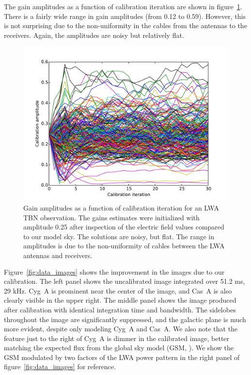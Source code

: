 \documentclass[a4paper,fleqn,usenatbib]{mnras}
\begin{document}
The gain amplitudes as a function of calibration iteration are shown in 
figure~\ref{fig:data_amp}. There is a fairly wide range in gain amplitudes (from 0.12 to 0.59). 
However, this is not surprising due to the non-uniformity in the cables from the antennas to the 
receivers. Again, the amplitudes are noisy but relatively flat.

\begin{figure}
\begin{center}
\includegraphics[width=\columnwidth]{fig7.pdf}
\caption{Gain amplitudes as a function of calibration iteration for an LWA TBN observation. The 
gains estimates were initialized with amplitude 0.25 after inspection of the electric field values 
compared to our model sky. The solutions are noisy, but flat. The range in amplitudes is due to 
the non-uniformity of cables between the LWA antennas and receivers.
}
\label{fig:data_amp}
\end{center}
\end{figure}

Figure~\ref{fig:data_images} shows the improvement in the images due to our calibration. The 
left panel shows the uncalibrated image integrated over 51.2 ms, 29 kHz. Cyg~A is prominent 
near the center of the image, and Cas~A is also clearly visible in the upper right. The middle 
panel shows the image produced after calibration with identical integration time and bandwidth. 
The sidelobes throughout the image are significantly suppressed, and the galactic plane is 
much more evident, despite only modeling Cyg~A and Cas~A. We also note that the feature 
just to the right of Cyg~A is dimmer in the calibrated image, better matching the expected flux 
from the global sky model (GSM, \citealt{deo08}). We show the GSM \citep{pri16} modulated 
by two factors of the LWA power pattern in the right panel of figure~\ref{fig:data_images} for 
reference.
\end{document}
